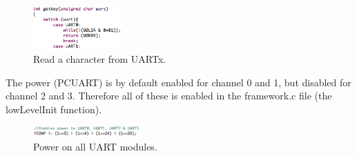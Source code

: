 \begin{figure}[h!]		%
 \begin{centering}
  \includegraphics[width=0.3\textwidth]{recieveuart.png}
   \caption{Read a character from UARTx.}
 \end{centering}
\end{figure}

The power (PCUART) is by default enabled for channel 0 and 1, but disabled for channel 2 and 3. Therefore all of these is enabled in the framework.c file
(the lowLevelInit function).

\begin{figure}[h!]		%
 \begin{centering}
  \includegraphics[width=0.37\textwidth]{powerenable.png}
   \caption{Power on all UART modules.}
 \end{centering}
\end{figure}


